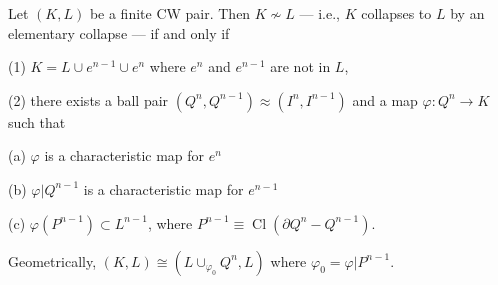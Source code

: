 Let $(K, L)$ be a finite CW pair. Then $K \not\sim L$ — i.e., $K$ collapses to $L$ by an elementary collapse — if and only if

(1) $K = L \cup e^{n-1} \cup e^n$ where $e^n$ and $e^{n-1}$ are not in $L$,

(2) there exists a ball pair $(Q^n, Q^{n-1}) \approx (I^n, I^{n-1})$ and a map $\varphi: Q^n \rightarrow K$ such that

\quad (a) $\varphi$ is a characteristic map for $e^n$

\quad (b) $\varphi|Q^{n-1}$ is a characteristic map for $e^{n-1}$

\quad (c) $\varphi(P^{n-1}) \subset L^{n-1}$, where $P^{n-1} \equiv \operatorname{Cl}(\partial Q^n - Q^{n-1})$.

Geometrically, $(K, L) \cong (L \cup_{\varphi_0} Q^n, L)$ where $\varphi_0 = \varphi|P^{n-1}$.
